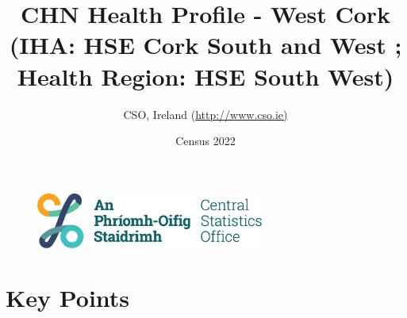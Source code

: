 \documentclass{article}
\title{CHN Health Profile - West Cork (IHA: HSE Cork South and West ;  Health Region: HSE South West) }
\date{Census 2022}
\author{CSO, Ireland  (\url{http://www.cso.ie)}}
\begin{document}


\begin{figure}
	\centering
\includegraphics[width =75mm]{../figures/CSO_Logo.png}
\end{figure}

				 
		   
						  
														  
																																													
												 
			 
\maketitle
					
													   
				 
						 
																																																																											   
				 
				  
  \pagebreak
    	    \tableofcontents

\pagebreak


\section{Key Points}
\end{document}
